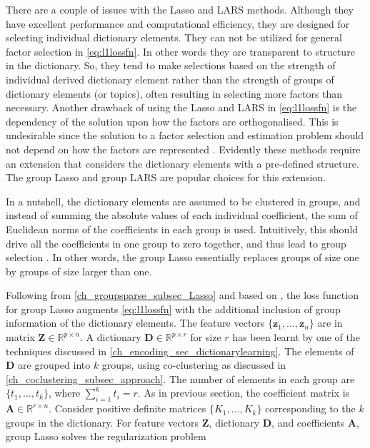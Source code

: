 There are a couple of issues with the Lasso and LARS methods. Although they have excellent performance and computational efficiency, they are designed for selecting individual dictionary elements. They can not be utilized for general factor selection in \cref{eq:l1lossfn}. In other words they are transparent to structure in the dictionary. So, they tend to make selections based on the strength of individual derived dictionary element rather than the strength of groups of dictionary elements (or topics), often resulting in selecting more factors than necessary. Another drawback of using the Lasso and LARS in \cref{eq:l1lossfn} is the dependency of the solution upon how the factors are orthogonalised. This is undesirable since the solution to a factor selection and estimation problem should not depend on how the factors are represented \citep{Yuan2006}. Evidently these methods require an extension that considers the dictionary elements with a pre-defined structure. The group Lasso and group LARS \citep{
Yuan2006, Bach2008} are popular choices for this extension. 

In a nutshell, the dictionary elements are assumed to be clustered in groups, and instead of summing the absolute values of each individual coefficient, the sum of Euclidean norms of the coefficients in each group is used. Intuitively, this should drive all the coefficients in one group to zero together, and thus lead to group selection \citep{Yuan2006}. In other words, the group Lasso essentially replaces groups of size one by groups of size larger than one.

Following from \cref{ch_groupsparse_subsec_Lasso} and based on \citep{Yuan2006}, the loss function for group Lasso augments \cref{eq:l1lossfn} with the additional inclusion of group information of the dictionary elements. The feature vectors $\{\mathbf{z}_{1}, \ldots, \mathbf{z}_{n}\}$ are in matrix $\mathbf{Z} \in \mathds{R}^{p \times n}$. A dictionary $\mathbf{D} \in \mathds{R}^{p \times r}$ for size $r$ has been learnt by one of the techniques discussed in \cref{ch_encoding_sec_dictionarylearning}. The elements of $\mathbf{D}$ are grouped into $k$ groups, using co-clustering as discussed in \cref{ch_coclustering_subsec_approach}. The number of elements in each group are $\{t_{1}, \ldots, t_{k} \}$, where $\sum_{i=1}^{k} t_{i} = r$. As in previous section, the coefficient matrix is $\mathbf{A} \in \mathds{R}^{r \times n}$. Consider positive definite matrices $\{K_{1}, \ldots, K_{k} \}$ corresponding to the $k$ groups in the dictionary. For feature vectors $\mathbf{Z}$, dictionary $\mathbf{D}$, and coefficients $\mathbf{A}$, group Lasso solves the regularization problem

